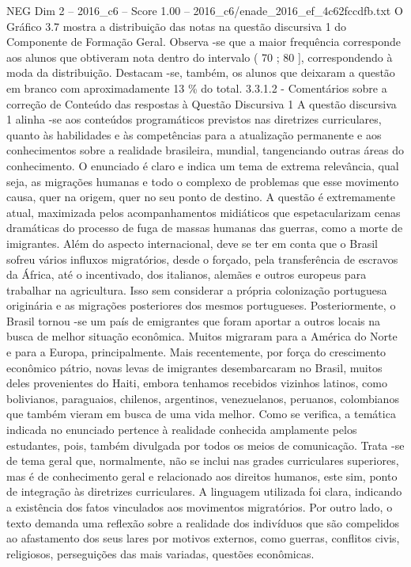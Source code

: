 \begin{textsample}{NEG Dim 2 – 2016\_c6 – Score 1.00 – 2016\_c6/enade\_2016\_ef\_4c62fccdfb.txt}
O Gráfico 3.7 mostra a distribuição das notas na questão discursiva 1 do Componente de Formação Geral.
Observa -se que a maior frequência corresponde aos alunos que obtiveram nota dentro do intervalo ( 70 ; 80 ], correspondendo à moda da distribuição.
Destacam -se, também, os alunos que deixaram a questão em branco com aproximadamente 13 \% do total. 3.3.1.2 - Comentários sobre a correção de Conteúdo das respostas à Questão Discursiva 1 A questão discursiva 1 alinha -se aos conteúdos programáticos previstos nas diretrizes curriculares, quanto às habilidades e às competências para a atualização permanente e aos conhecimentos sobre a realidade brasileira, mundial, tangenciando outras áreas do conhecimento.
O enunciado é claro e indica um tema de extrema relevância, qual seja, as migrações humanas e todo o complexo de problemas que esse movimento causa, quer na origem, quer no seu ponto de destino.
A questão é extremamente atual, maximizada pelos acompanhamentos midiáticos que espetacularizam cenas dramáticas do processo de fuga de massas humanas das guerras, como a morte de imigrantes.
Além do aspecto internacional, deve se ter em conta que o Brasil sofreu vários influxos migratórios, desde o forçado, pela transferência de escravos da África, até o incentivado, dos italianos, alemães e outros europeus para trabalhar na agricultura.
Isso sem considerar a própria colonização portuguesa originária e as migrações posteriores dos mesmos portugueses.
Posteriormente, o Brasil tornou -se um país de emigrantes que foram aportar a outros locais na busca de melhor situação econômica.
Muitos migraram para a América do Norte e para a Europa, principalmente.
Mais recentemente, por força do crescimento econômico pátrio, novas levas de imigrantes desembarcaram no Brasil, muitos deles provenientes do Haiti, embora tenhamos recebidos vizinhos latinos, como bolivianos, paraguaios, chilenos, argentinos, venezuelanos, peruanos, colombianos que também vieram em busca de uma vida melhor.
Como se verifica, a temática indicada no enunciado pertence à realidade conhecida amplamente pelos estudantes, pois, também divulgada por todos os meios de comunicação.
Trata -se de tema geral que, normalmente, não se inclui nas grades curriculares superiores, mas é de conhecimento geral e relacionado aos direitos humanos, este sim, ponto de integração às diretrizes curriculares.
A linguagem utilizada foi clara, indicando a existência dos fatos vinculados aos movimentos migratórios.
Por outro lado, o texto demanda uma reflexão sobre a realidade dos indivíduos que são compelidos ao afastamento dos seus lares por motivos externos, como guerras, conflitos civis, religiosos, perseguições das mais variadas, questões econômicas.

\end{textsample}
